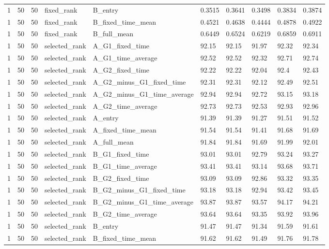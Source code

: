 \begin{longtable}{llllllllll}
1 & 50 & 50 & fixed\_rank & B\_entry & 0.3515 & 0.3641 & 0.3498 & 0.3834 & 0.3874 \\
1 & 50 & 50 & fixed\_rank & B\_fixed\_time\_mean & 0.4521 & 0.4638 & 0.4444 & 0.4878 & 0.4922 \\
1 & 50 & 50 & fixed\_rank & B\_full\_mean & 0.6449 & 0.6524 & 0.6219 & 0.6859 & 0.6911 \\
1 & 50 & 50 & selected\_rank & A\_G1\_fixed\_time & 92.15 & 92.15 & 91.97 & 92.32 & 92.34 \\
1 & 50 & 50 & selected\_rank & A\_G1\_time\_average & 92.52 & 92.52 & 92.32 & 92.71 & 92.74 \\
1 & 50 & 50 & selected\_rank & A\_G2\_fixed\_time & 92.22 & 92.22 & 92.04 & 92.4 & 92.43 \\
1 & 50 & 50 & selected\_rank & A\_G2\_minus\_G1\_fixed\_time & 92.31 & 92.31 & 92.12 & 92.49 & 92.51 \\
1 & 50 & 50 & selected\_rank & A\_G2\_minus\_G1\_time\_average & 92.94 & 92.94 & 92.72 & 93.15 & 93.18 \\
1 & 50 & 50 & selected\_rank & A\_G2\_time\_average & 92.73 & 92.73 & 92.53 & 92.93 & 92.96 \\
1 & 50 & 50 & selected\_rank & A\_entry & 91.39 & 91.39 & 91.27 & 91.51 & 91.52 \\
1 & 50 & 50 & selected\_rank & A\_fixed\_time\_mean & 91.54 & 91.54 & 91.41 & 91.68 & 91.69 \\
1 & 50 & 50 & selected\_rank & A\_full\_mean & 91.84 & 91.84 & 91.69 & 91.99 & 92.01 \\
1 & 50 & 50 & selected\_rank & B\_G1\_fixed\_time & 93.01 & 93.01 & 92.79 & 93.24 & 93.27 \\
1 & 50 & 50 & selected\_rank & B\_G1\_time\_average & 93.41 & 93.41 & 93.14 & 93.68 & 93.71 \\
1 & 50 & 50 & selected\_rank & B\_G2\_fixed\_time & 93.09 & 93.09 & 92.86 & 93.32 & 93.35 \\
1 & 50 & 50 & selected\_rank & B\_G2\_minus\_G1\_fixed\_time & 93.18 & 93.18 & 92.94 & 93.42 & 93.45 \\
1 & 50 & 50 & selected\_rank & B\_G2\_minus\_G1\_time\_average & 93.87 & 93.87 & 93.57 & 94.17 & 94.21 \\
1 & 50 & 50 & selected\_rank & B\_G2\_time\_average & 93.64 & 93.64 & 93.35 & 93.92 & 93.96 \\
1 & 50 & 50 & selected\_rank & B\_entry & 91.47 & 91.47 & 91.34 & 91.59 & 91.61 \\
1 & 50 & 50 & selected\_rank & B\_fixed\_time\_mean & 91.62 & 91.62 & 91.49 & 91.76 & 91.78 \\

\end{longtable}
